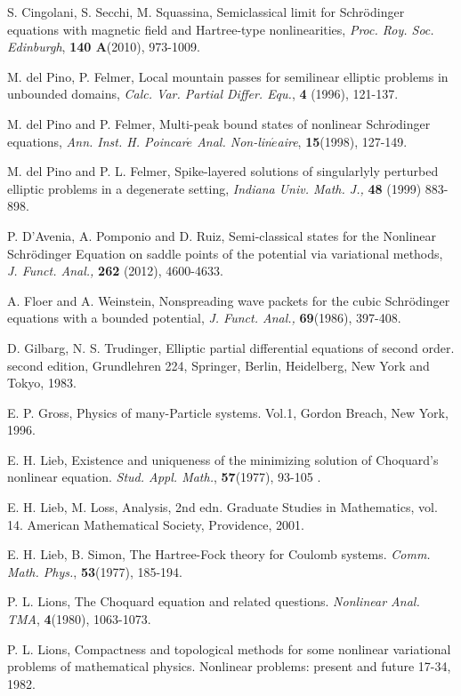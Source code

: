 \documentclass[12pt,reqno]{amsart}
\numberwithin{equation}{section}
\begin{document}
\begin{thebibliography}{100}
 S. Cingolani, S. Secchi, M. Squassina, Semiclassical limit for Schr\"{o}dinger equations with magnetic field and Hartree-type nonlinearities, {\it Proc. Roy. Soc. Edinburgh}, {\bf 140 A}(2010), 973-1009.

 M. del Pino, P. Felmer, Local mountain passes for semilinear elliptic problems in unbounded domains, {\it Calc. Var. Partial
Differ. Equ.}, {\bf 4} (1996), 121-137.

 M. del Pino and P. Felmer, Multi-peak bound states of nonlinear Schr$\ddot{o}$dinger
equations, {\it Ann. Inst. H. Poincar$\acute{e}$ Anal. Non-lin$\acute{e}$aire},  {\bf  15}(1998), 127-149.

 M. del Pino and P. L. Felmer, Spike-layered solutions of singularlyly perturbed elliptic problems in a
degenerate setting, {\it Indiana Univ. Math. J., } {\bf 48} (1999) 883-898.

 P. D'Avenia, A. Pomponio and D. Ruiz, Semi-classical states for the Nonlinear
Schr\"{o}dinger Equation on saddle points of the potential via variational methods, {\it J.
Funct. Anal.,} {\bf 262} (2012), 4600-4633.

 A. Floer and A. Weinstein, Nonspreading wave packets for the cubic Schr\"{o}dinger
equations with a bounded potential, {\it J. Funct. Anal., } {\bf 69}(1986), 397-408.

 D. Gilbarg, N. S. Trudinger, Elliptic partial differential equations  of second order. second edition, Grundlehren 224, Springer, Berlin, Heidelberg, New York and Tokyo, 1983.

 E. P. Gross, Physics of many-Particle systems. Vol.1, Gordon Breach, New York, 1996.

 E. H. Lieb, Existence and uniqueness of the minimizing solution of Choquard's nonlinear equation. {\it Stud. Appl. Math.}, {\bf57}(1977), 93-105 .

 E. H. Lieb, M. Loss, Analysis, 2nd edn. Graduate Studies in Mathematics, vol. 14. American Mathematical Society, Providence, 2001.

 E. H. Lieb, B. Simon, The Hartree-Fock theory for Coulomb systems. {\it Comm. Math. Phys.}, {\bf 53}(1977), 185-194.

 P. L. Lions, The Choquard equation and related questions. {\it Nonlinear Anal. TMA}, {\bf4}(1980), 1063-1073.

 P. L. Lions, Compactness and topological methods for some nonlinear variational problems of mathematical physics.
Nonlinear problems: present and future 17-34, 1982.


\end{thebibliography}
\end{document}
